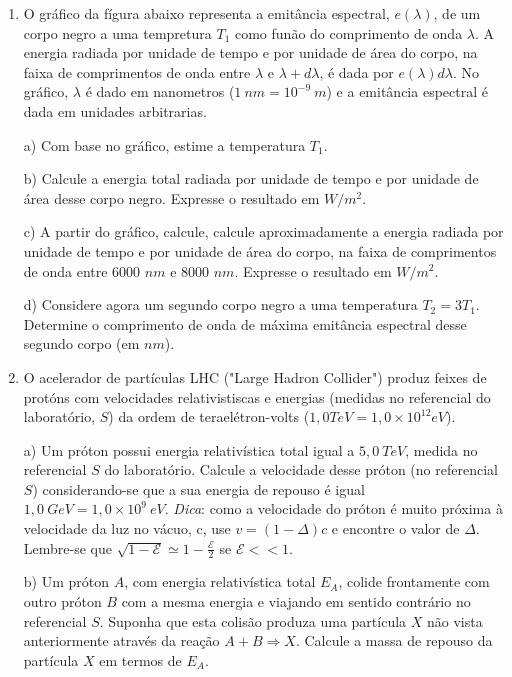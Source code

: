 \begin{enumerate}[start=1,label={\bfseries Q\arabic*.}]
\item O gráfico da fígura abaixo representa a emitância espectral, $e(\lambda)$, de um corpo negro a uma tempretura $T_{1}$ como funão do comprimento de onda $\lambda$. A energia radiada por unidade de tempo e por unidade de área do corpo, na faixa de comprimentos de onda entre $\lambda$ e $\lambda + d \lambda$, é dada por $e(\lambda)d\lambda$. No gráfico, $\lambda$ é dado em nanometros ($1 \ nm = 10^{-9} \ m$) e a emitância espectral é dada em unidades arbitrarias.



  a) Com base no gráfico, estime a temperatura $T_{1}$.

  \resposta

  b) Calcule a energia total radiada por unidade de tempo e por unidade de área desse corpo negro. Expresse o resultado em $W/m^{2}$.

  \resposta

  c) A partir do gráfico, calcule, calcule aproximadamente a energia radiada por unidade de tempo e por unidade de área do corpo, na faixa de comprimentos de onda entre 6000 $nm$ e 8000 $nm$. Expresse o resultado em $W/m^{2}$.

  \resposta

  d) Considere agora um segundo corpo negro a uma temperatura $T_{2} = 3T_{1}$. Determine o comprimento de onda de máxima emitância espectral desse segundo corpo (em $nm$).




\item O acelerador de partículas LHC ("Large Hadron Collider") produz feixes de protóns com velocidades relativistiscas e energias (medidas no referencial do laboratório, $ S $) da ordem de teraelétron-volts ($ 1,0 TeV = 1,0 \times 10^{12} eV $).


  a) Um próton possui energia relativística total igual a $5,0 \ TeV$, medida no referencial $ S $ do laboratório. Calcule a velocidade desse próton (no referencial $ S $) considerando-se que a sua energia de repouso é igual $1,0 \ GeV = 1,0 \times 10^{9} \ eV $. \textit{Dica}: como a velocidade do próton é muito próxima à velocidade da luz no vácuo, c, use $v = (1 - \Delta)c$ e encontre o valor de $\Delta$. Lembre-se que $\sqrt{1-\mathcal{E}} \simeq 1 - \frac{\mathcal{E}}{2}$ se $\mathcal{E} << 1$.

  \resposta

  b) Um próton $A$, com energia relativística total $E_{A}$, colide frontamente com outro próton $B$ com a mesma energia e viajando em sentido contrário no referencial $ S $. Suponha que esta colisão produza uma partícula $X$ não vista anteriormente através da reação $A+B \Rightarrow X$. Calcule a massa de repouso da partícula $X$ em termos de $E_{A}$.


\end{enumerate}
